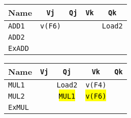 \begin{enumerate}
    \begin{minipage}[t]{0.45\textwidth}
        \centering
        \begin{tabular}{@{} l | c c c c @{}}
            \toprule
            Name            & \texttt{Vj}           & \texttt{Qj}                       & \texttt{Vk}           & \texttt{Qk}           \\
            \midrule
            \texttt{ADD1}   & \texttt{v(F6)}        &                                   &                       & \texttt{Load2}        \\ [.3em]
            \texttt{ADD2}   &                       &                                   &                       &                       \\
            \cmidrule{1-5}
            \texttt{ExADD}  &                       &                                   &                       &                       \\
            \bottomrule
        \end{tabular}
    \end{minipage}
    \hfill
    \begin{minipage}[t]{0.45\textwidth}
            \centering
            \begin{tabular}{@{} l | c c c c @{}}
                \toprule
                Name            & \texttt{Vj}   & \texttt{Qj}           & \texttt{Vk}           & \texttt{Qk}   \\
                \midrule
                \texttt{MUL1}   &               & \texttt{Load2}        & \texttt{v(F4)}        &               \\ [.3em]
                \texttt{MUL2}   &               & \hl{\texttt{MUL1}}    & \hl{\texttt{v(F6)}}   &               \\
                \cmidrule{1-5}
                \texttt{ExMUL}  &               &                       &                       &               \\
                \bottomrule
            \end{tabular}
    \end{minipage}


\end{enumerate}
